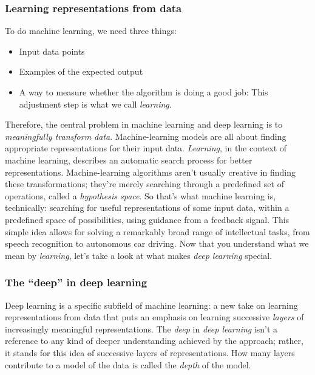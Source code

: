 \documentclass{article}
\numberwithin{equation}{section} %
\begin{document}
\subsubsection{Learning representations from data}

To do machine learning, we need three things: \\

\begin{itemize}
	\item Input data points
	\item Examples of the expected output
	\item A way to measure whether the algorithm is doing a good job:  This adjustment step is what we call \textit{learning}.
\end{itemize}

Therefore, the central problem in machine learning and deep learning is to \textit{meaningfully transform data}. Machine-learning models are all about finding appropriate representations for their input data. \textit{Learning}, in the context of machine learning, describes an automatic search process for better representations. Machine-learning algorithms aren’t usually creative in finding these transformations; they’re merely searching through a predefined set of
operations, called a \textit{hypothesis space}. So that’s what machine learning is, technically: searching for useful representations of some input data, within a predefined space of possibilities, using guidance from a feedback signal. This simple idea allows for solving a remarkably broad range of intellectual tasks, from speech recognition to autonomous car driving. Now that you understand what we mean by \textit{learning}, let’s take a look at what makes \textit{deep learning} special. \\


\subsubsection{The “deep” in deep learning}

Deep learning is a specific subfield of machine learning: a new take on learning representations from data that puts an emphasis on learning successive \textit{layers} of increasingly meaningful representations. The \textit{deep} in \textit{deep learning} isn’t a reference to any kind of deeper understanding achieved by the approach; rather, it stands for this idea of successive layers of representations. How many layers contribute to a model of the data is called the \textit{depth} of the model. \\
\end{document}
